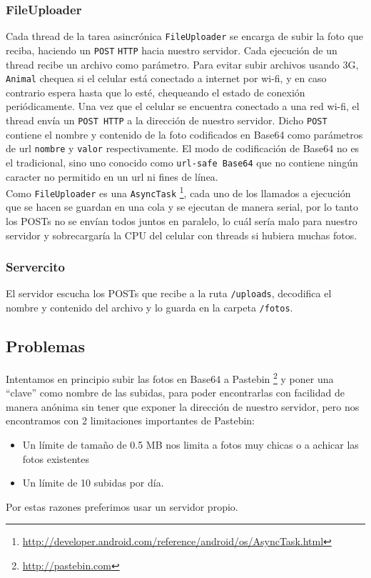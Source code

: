 		\subsubsection{FileUploader}
			Cada thread de la tarea asincrónica \texttt{FileUploader} se encarga de subir la foto que reciba, haciendo un \texttt{POST} \texttt{HTTP} hacia nuestro servidor. Cada ejecución de un thread recibe un archivo como parámetro. Para evitar subir archivos usando 3G, \texttt{Animal} chequea si el celular está conectado a internet por wi-fi, y en caso contrario espera hasta que lo esté, chequeando el estado de conexión periódicamente. Una vez que el celular se encuentra conectado a una red wi-fi, el thread envía un \texttt{POST HTTP} a la dirección de nuestro servidor. Dicho \texttt{POST} contiene el nombre y contenido de la foto codificados en Base64 como parámetros de url \texttt{nombre} y \texttt{valor} respectivamente. El modo de codificación de Base64 no es el tradicional, sino uno conocido como \texttt{url-safe Base64} que no contiene ningún caracter no permitido en un url ni fines de línea.\\

			Como \texttt{FileUploader} es una \texttt{AsyncTask} \footnote{\url{http://developer.android.com/reference/android/os/AsyncTask.html}}, cada uno de los llamados a ejecución que se hacen se guardan en una cola y se ejecutan de manera serial, por lo tanto los POSTs no se envían todos juntos en paralelo, lo cuál sería malo para nuestro servidor y sobrecargaría la CPU del celular con threads si hubiera muchas fotos.
		
		\subsubsection{Servercito}
			El servidor escucha los POSTs que recibe a la ruta \texttt{/uploads}, decodifica el nombre y contenido del archivo y lo guarda en la carpeta \texttt{/fotos}.

	\subsection{Problemas}
		Intentamos en principio subir las fotos en Base64 a Pastebin \footnote{ \url{http://pastebin.com} } y poner una ``clave'' como nombre de las subidas, para poder encontrarlas con facilidad de manera anónima sin tener que exponer la dirección de nuestro servidor, pero nos encontramos con 2 limitaciones importantes de Pastebin: 
		\begin{itemize}
			\item Un l\'imite de tamaño de 0.5 MB nos limita a fotos muy chicas o a achicar las fotos existentes
			\item Un l\'imite de 10 subidas por d\'ia.
		\end{itemize}

		Por estas razones preferimos usar un servidor propio.

